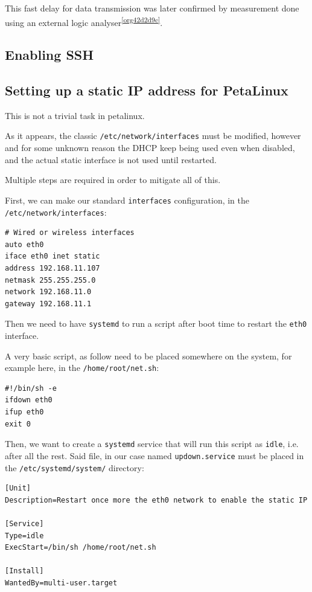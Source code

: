 \documentclass[10pt]{article}
\begin{document}
This fast delay for data transmission was later confirmed by measurement done using an external logic analyser\textsuperscript{\ref{org42d2d9c}}.

\subsection{Enabling SSH}
\label{sec:org01396f9}
\subsection{Setting up a static IP address for PetaLinux}
\label{sec:org99975ea}
This is not a trivial task in petalinux.

As it appears, the classic \texttt{/etc/network/interfaces} must be modified, however and
for some unknown reason the DHCP keep being used even when disabled, and the
actual static interface is not used until restarted.

Multiple steps are required in order to mitigate all of this.

First, we can make our standard \texttt{interfaces} configuration, in the  \texttt{/etc/network/interfaces}:
\begin{verbatim}
# Wired or wireless interfaces
auto eth0
iface eth0 inet static
address 192.168.11.107
netmask 255.255.255.0
network 192.168.11.0
gateway 192.168.11.1
\end{verbatim}

Then we need to have \texttt{systemd} to run a script after boot time to restart the \texttt{eth0} interface.

A very basic script, as follow need to be placed somewhere on the system, for example here, in the \texttt{/home/root/net.sh}:
\begin{verbatim}
#!/bin/sh -e
ifdown eth0
ifup eth0
exit 0
\end{verbatim}

Then, we want to create a \texttt{systemd} service that will run this script as \texttt{idle},
i.e. after all the rest. Said file, in our case named \texttt{updown.service} must be
placed in the \texttt{/etc/systemd/system/} directory:
\begin{verbatim}
[Unit]
Description=Restart once more the eth0 network to enable the static IP

[Service]
Type=idle
ExecStart=/bin/sh /home/root/net.sh

[Install]
WantedBy=multi-user.target
\end{verbatim}
\end{document}
